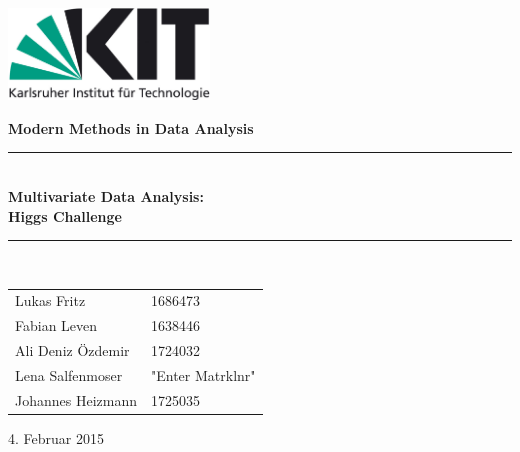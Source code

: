 \documentclass[11pt,a4paper]{scrartcl}
\newcommand{\Versuchsname}{Multivariate Data Analysis: \\ Higgs Challenge}			%
\newcommand{\Datum}{4. Februar 2015}			%
\begin{document}
\newcommand{\bra}[1]{\ensuremath{\left( #1 \right)}}
\newcommand{\abs}[1]{\ensuremath{\left| #1 \right|}}
\newcommand{\diff}[2]{\ensuremath{\frac{\partial #1}{\partial #2}}}

\newcommand{\HRule}{\rule{\linewidth}{0.5mm}}
\newcommand{\E}[1]{\textrm{#1}}
\begin{titlepage}
	\begin{flushright}
		\includegraphics[width=0.4\textwidth]{kit_logo_de_farbe_positiv.jpg}\\[1cm] 
	\end{flushright}
	\vspace{2cm}
	\begin{center}
	{\huge \textbf{Modern Methods in Data Analysis}}
	\vspace{1cm}

\HRule \\[0.4cm]
{ \huge \bfseries \Versuchsname}\\[0.2cm]
\HRule \\[0.5cm]

\begin{flushleft}
	\begin{minipage}{0.4\textwidth}
	\large
		\begin{tabular}{l l}
			Lukas Fritz & 1686473 \\
			Fabian Leven & 1638446\\
			Ali Deniz Özdemir & 1724032\\
			Lena Salfenmoser & "Enter Matrklnr"\\
			Johannes Heizmann & 1725035 \\
		\end{tabular}
	\end{minipage}
\end{flushleft}
\vfill

{\large \Datum}
\end{center}

\end{titlepage}
\tableofcontents
\newpage










%
%
%
\end{document}
